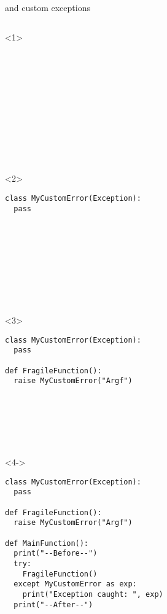 \begin{frame}[fragile]{}

   and custom exceptions

    \begin{columns}[onlytextwidth]
    \begin{column}{\textwidth}

      \begin{onlyenv}<1>
        \begin{lstlisting}[style=python,morekeywords={as},basicstyle=\ttfamily\footnotesize]












 \end{lstlisting}
      \end{onlyenv}

      \begin{onlyenv}<2>
        \begin{lstlisting}[style=python,morekeywords={as},basicstyle=\ttfamily\footnotesize]
class MyCustomError(Exception):
  pass










 \end{lstlisting}
      \end{onlyenv}

      \begin{onlyenv}<3>
        \begin{lstlisting}[style=python,morekeywords={as},basicstyle=\ttfamily\footnotesize]
class MyCustomError(Exception):
  pass

def FragileFunction():
  raise MyCustomError("Argf")







 \end{lstlisting}
      \end{onlyenv}

      \begin{onlyenv}<4->
        \begin{lstlisting}[style=python,morekeywords={as},basicstyle=\ttfamily\footnotesize]
class MyCustomError(Exception):
  pass

def FragileFunction():
  raise MyCustomError("Argf")

def MainFunction():
  print("--Before--")
  try:
    FragileFunction()
  except MyCustomError as exp:
    print("Exception caught: ", exp)
  print("--After--") \end{lstlisting}
      \end{onlyenv}

    \end{column}
  \end{columns}

\end{frame}